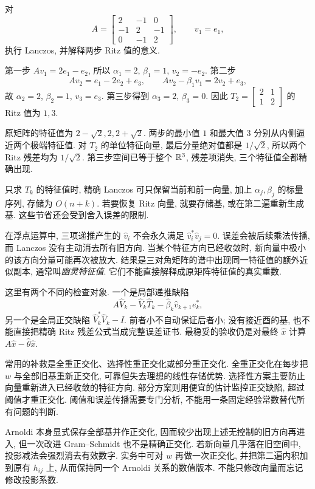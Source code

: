 \begin{example}
对
\[
A=\begin{bmatrix}2&-1&0\\-1&2&-1\\0&-1&2\end{bmatrix},\qquad v_1=e_1,
\]
执行 Lanczos, 并解释两步 Ritz 值的意义.
\end{example}
\begin{solution}
第一步 $Av_1=2e_1-e_2$, 所以 $\alpha_1=2$, $\beta_1=1$, $v_2=-e_2$. 第二步
\[
Av_2=e_1-2e_2+e_3,\qquad
Av_2-\beta_1v_1=2v_2+e_3,
\]
故 $\alpha_2=2$, $\beta_2=1$, $v_3=e_3$. 第三步得到 $\alpha_3=2$, $\beta_3=0$. 因此
$T_2=\begin{bmatrix}2&1\\1&2\end{bmatrix}$ 的 Ritz 值为 $1,3$.

原矩阵的特征值为 $2-\sqrt2,2,2+\sqrt2$. 两步的最小值 $1$ 和最大值 $3$ 分别从内侧逼近两个极端特征值. 对 $T_2$ 的单位特征向量, 最后分量绝对值都是 $1/\sqrt2$, 所以两个 Ritz 残差均为 $1/\sqrt2$. 第三步空间已等于整个 $\mathbb R^3$, 残差项消失, 三个特征值全都精确出现.
\end{solution}
只求 $T_k$ 的特征值时, 精确 Lanczos 可只保留当前和前一向量, 加上 $\alpha_j,\beta_j$ 的标量序列, 存储为 $O(n+k)$. 若要恢复 Ritz 向量, 就要存储基, 或在第二遍重新生成基. 这些节省还会受到舍入误差的限制.

在浮点运算中, 三项递推产生的 $\widehat v_i$ 不会永久满足 $\widehat v_i^*\widehat v_j=0$. 误差会被后续乘法传播, 而 Lanczos 没有主动消去所有旧方向. 当某个特征方向已经收敛时, 新向量中极小的该方向分量可能再次被放大. 结果是三对角矩阵的谱中出现同一特征值的额外近似副本, 通常叫\emph{幽灵特征值}. 它们不能直接解释成原矩阵特征值的真实重数.

这里有两个不同的检查对象. 一个是局部递推缺陷
\[
A\widehat V_k-\widehat V_k\widehat T_k
-\widehat\beta_k\widehat v_{k+1}e_k^*,
\]
另一个是全局正交缺陷 $\widehat V_k^*\widehat V_k-I$. 前者小不自动保证后者小; 没有接近酉的基, 也不能直接把精确 Ritz 残差公式当成完整误差证书. 最稳妥的验收仍是对最终 $\widehat x$ 计算 $A\widehat x-\widehat\theta\widehat x$.

常用的补救是全重正交化、选择性重正交化或部分重正交化. 全重正交化在每步把 $w$ 与全部旧基重新正交化, 可靠但失去理想的线性存储优势. 选择性方案主要防止向量重新进入已经收敛的特征方向. 部分方案则用便宜的估计监控正交缺陷, 超过阈值才重正交化. 阈值和误差传播需要专门分析, 不能用一条固定经验常数替代所有问题的判断.

Arnoldi 本身显式保存全部基并作正交化, 因而较少出现上述无控制的旧方向再进入, 但一次改进 Gram--Schmidt 也不是精确正交化. 若新向量几乎落在旧空间中, 投影减法会强烈消去有效数字. 实务中可对 $w$ 再做一次正交化, 并把第二遍内积加到原有 $h_{ij}$ 上, 从而保持同一个 Arnoldi 关系的数值版本. 不能只修改向量而忘记修改投影系数.

